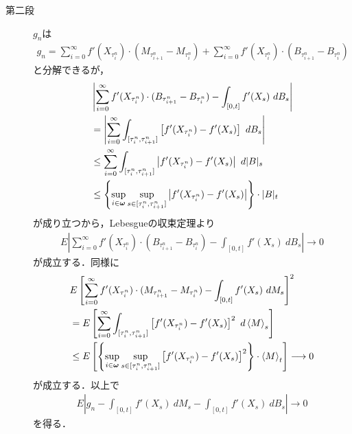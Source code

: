 \begin{sketch}
\begin{description}
			\item[第二段]
				$g_{n}$は
				\begin{align}
					g_{n} = \sum_{i=0}^{\infty} f'(X_{\tau^{n}_{i}}) \cdot (M_{\tau^{n}_{i+1}} - M_{\tau^{n}_{i}})
					+ \sum_{i=0}^{\infty} f'(X_{\tau^{n}_{i}}) \cdot (B_{\tau^{n}_{i+1}} - B_{\tau^{n}_{i}})
				\end{align}
				と分解できるが，
				\begin{align}
					&\left|\sum_{i=0}^{\infty} f'(X_{\tau^{n}_{i}}) \cdot (B_{\tau^{n}_{i+1}} - B_{\tau^{n}_{i}}) - \int_{[0,t]} f'(X_{s})\ dB_{s}\right| \\
					&= \left|\sum_{i=0}^{\infty} \int_{[\tau^{n}_{i},\tau^{n}_{i+1}]} \left[f'(X_{\tau^{n}_{i}}) - f'(X_{s}) \right]\ dB_{s}\right| \\
					&\leq \sum_{i=0}^{\infty} \int_{[\tau^{n}_{i},\tau^{n}_{i+1}]} \left|f'(X_{\tau^{n}_{i}}) - f'(X_{s}) \right|\ d|B|_{s} \\
					&\leq \left\{\sup{i \in \Natural}{\sup{s \in [\tau^{n}_{i},\tau^{n}_{i+1}]}{
					\left|f'(X_{\tau^{n}_{i}}) - f'(X_{s}) \right|}}\right\} \cdot |B|_{t}
				\end{align}
				が成り立つから，Lebesgueの収束定理より
				\begin{align}
					E\left|\sum_{i=0}^{\infty} f'(X_{\tau^{n}_{i}}) \cdot (B_{\tau^{n}_{i+1}} - B_{\tau^{n}_{i}}) - \int_{[0,t]} f'(X_{s})\ dB_{s}\right|
					\longrightarrow 0
				\end{align}
				が成立する．同様に
				\begin{align}
					&E\left[\sum_{i=0}^{\infty} f'(X_{\tau^{n}_{i}}) \cdot (M_{\tau^{n}_{i+1}} - M_{\tau^{n}_{i}}) - \int_{[0,t]} f'(X_{s})\ dM_{s}\right]^{2} \\
					&= E\left[\sum_{i=0}^{\infty} \int_{[\tau^{n}_{i},\tau^{n}_{i+1}]}\left[f'(X_{\tau^{n}_{i}}) - f'(X_{s}) \right]^{2}\ d\inprod<M>_{s} \right] 
					\label{fom:Ito_formula_1}\\
					&\leq E\left[\left\{\sup{i \in \Natural}{\sup{s \in [\tau^{n}_{i},\tau^{n}_{i+1}]}{
					\left[f'(X_{\tau^{n}_{i}}) - f'(X_{s}) \right]^{2}}}\right\} \cdot \inprod<M>_{t}\right] \longrightarrow 0
				\end{align}
				が成立する．以上で
				\begin{align}
					E\left|g_{n} - \int_{[0,t]} f'(X_{s})\ dM_{s} 
					- \int_{[0,t]} f'(X_{s})\ dB_{s}\right|
					\longrightarrow 0
				\end{align}
				を得る．
				

\end{description}
\end{sketch}
